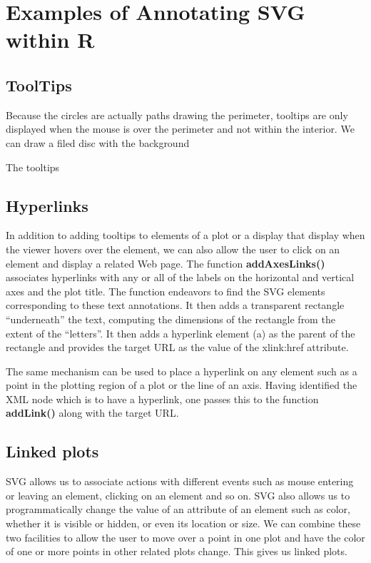 \documentclass[article]{jss}
\def\Rfunc#1{\textbf{#1()}}
\begin{document}
\section{Examples of Annotating SVG within R}

\subsection{ToolTips}
Because the circles are actually paths drawing
the perimeter, tooltips are only displayed
when the mouse is over the perimeter and
not within the interior.
We can draw a filed disc with the background

The tooltips

\subsection{Hyperlinks}
In addition to adding tooltips to elements of a plot or a display that
display when the viewer hovers over the element, we can also allow the
user to click on an element and display a related Web page.  The
function \Rfunc{addAxesLinks} associates hyperlinks with any or all of
the labels on the horizontal and vertical axes and the plot title.
The function endeavors to find the SVG elements corresponding to these
text annotations. It then adds a transparent rectangle ``underneath''
the text, computing the dimensions  of the rectangle from the extent
of the ``letters''.  It then adds a hyperlink element
(a) as the parent of the rectangle and provides the target URL
as the value of the  xlink:href attribute. 

The same mechanism can be used to place a hyperlink on any element
such as a point in the plotting region of a plot or the line of an
axis.  Having identified the XML node which is to have a hyperlink,
one passes this to the function \Rfunc{addLink} along with the target
URL.


\subsection{Linked plots}
SVG allows us to associate actions with different events such as mouse
entering or leaving an element, clicking on an element and so on.  SVG
also allows us to programmatically change the value of an attribute of
an element such as color, whether it is visible or hidden, or even its
location or size. We can combine these two facilities to
allow the user to move over a point in one plot
and have the color of one or more points in other related plots
change.  This gives us linked plots.
\end{document}
